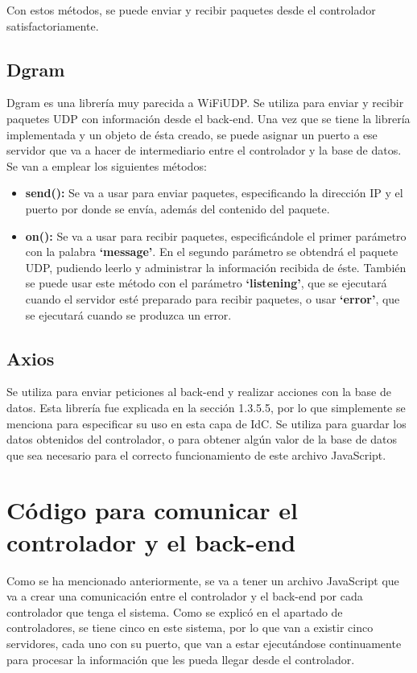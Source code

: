 Con estos métodos, se puede enviar y recibir paquetes desde el controlador satisfactoriamente.

\subsection{Dgram}
Dgram\cite{thirtythird} es una librería muy parecida a WiFiUDP. Se utiliza para enviar y recibir paquetes UDP con información desde el back-end. Una vez que se tiene la librería implementada y un objeto de ésta creado, se puede asignar un puerto a ese servidor que va a hacer de intermediario entre el controlador y la base de datos. Se van a emplear los siguientes métodos:

\begin{itemize}
    \item \textbf{send():} Se va a usar para enviar paquetes, especificando la dirección IP y el puerto por donde se envía, además del contenido del paquete.
    \item \textbf{on():} Se va a usar para recibir paquetes, especificándole el primer parámetro con la palabra \textbf{‘message’}. En el segundo parámetro se obtendrá el paquete UDP, pudiendo leerlo y administrar la información recibida de éste. También se puede usar este método con el parámetro \textbf{‘listening’}, que se ejecutará cuando el servidor esté preparado para recibir paquetes, o usar \textbf{‘error’}, que se ejecutará cuando se produzca un error.
\end{itemize}

\subsection{Axios}
Se utiliza para enviar peticiones al back-end y realizar acciones con la base de datos. Esta librería fue explicada en la sección 1.3.5.5, por lo que simplemente se menciona para especificar su uso en esta capa de IdC. Se utiliza para guardar los datos obtenidos del controlador, o para obtener algún valor de la base de datos que sea necesario para el correcto funcionamiento de este archivo JavaScript.

\section{Código para comunicar el controlador y el back-end}
Como se ha mencionado anteriormente, se va a tener un archivo JavaScript que va a crear una comunicación entre el controlador y el back-end por cada controlador que tenga el sistema. Como se explicó en el apartado de controladores, se tiene cinco en este sistema, por lo que van a existir cinco servidores, cada uno con su puerto, que van a estar ejecutándose continuamente para procesar la información que les pueda llegar desde el controlador.

